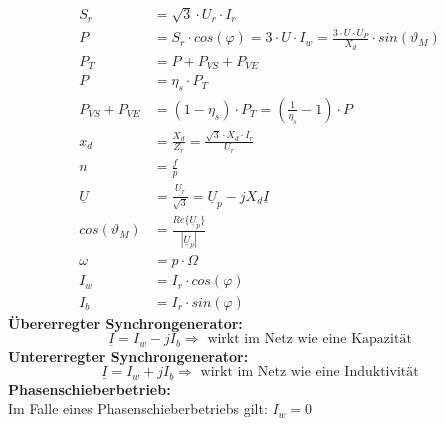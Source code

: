 \documentclass[a4paper,twocolumn,10pt]{article}
\begin{document}
\begin{equation*}
\begin{split}
S_r&=\sqrt{3}\cdot U_r\cdot I_r\\
P&=S_r\cdot cos(\varphi)=3\cdot U\cdot I_w=\frac{3\cdot U\cdot U_P}{X_d}\cdot sin(\vartheta_M)\\
P_T&=P+P_{VS}+P_{VE}\\
P&=\eta_s\cdot P_T\\
P_{VS}+P_{VE}&=(1-\eta_s)\cdot P_T=\left(\frac{1}{\eta_s}-1\right)\cdot P\\
x_d&=\frac{X_d}{Z_r}=\frac{\sqrt{3}\cdot X_d\cdot I_r}{U_r}\\
n&=\frac{f}{p}\\
\underline{U}&=\frac{\underline{U_r}}{\sqrt{3}}=\underline{U}_p-jX_d\underline{I}\\
cos(\vartheta_M)&=\frac{Re\{\underline{U}_p\}}{|\underline{U}_p|}\\
\omega&=p\cdot\Omega\\
I_w&=I_r\cdot cos(\varphi)\\
I_b&=I_r\cdot sin(\varphi)
\end{split}
\end{equation*}
\textbf{Übererregter Synchrongenerator:}
\begin{equation*}
\underline{I}=I_w-jI_ b \Rightarrow \text{ wirkt im Netz wie eine Kapazität}
\end{equation*}
\textbf{Untererregter Synchrongenerator:}
\begin{equation*}
\underline{I}=I_w+jI_b \Rightarrow \text{ wirkt im Netz wie eine Induktivität}
\end{equation*}
\textbf{Phasenschieberbetrieb:}\\
Im Falle eines Phasenschieberbetriebs gilt: $I_w=0$
\end{document}
